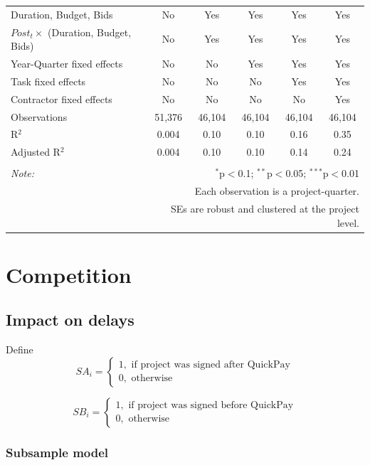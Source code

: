 \documentclass[
]{article}
\begin{document}
\begin{table}[H]
\begin{tabular}{@{\extracolsep{-2pt}}lccccc}
Duration, Budget, Bids & No & Yes & Yes & Yes & Yes \\ 
$Post_t \times $  (Duration, Budget, Bids) & No & Yes & Yes & Yes & Yes \\ 
Year-Quarter fixed effects & No & No & Yes & Yes & Yes \\ 
Task fixed effects & No & No & No & Yes & Yes \\ 
Contractor fixed effects & No & No & No & No & Yes \\ 
Observations & 51,376 & 46,104 & 46,104 & 46,104 & 46,104 \\ 
R$^{2}$ & 0.004 & 0.10 & 0.10 & 0.16 & 0.35 \\ 
Adjusted R$^{2}$ & 0.004 & 0.10 & 0.10 & 0.14 & 0.24 \\ 
\hline 
\hline \\[-1.8ex] 
\textit{Note:}  & \multicolumn{5}{r}{$^{*}$p$<$0.1; $^{**}$p$<$0.05; $^{***}$p$<$0.01} \\ 
 & \multicolumn{5}{r}{Each observation is a project-quarter.} \\ 
 & \multicolumn{5}{r}{SEs are robust and clustered at the project level.} \\ 
\end{tabular} 
\end{table}

\hypertarget{competition}{%
\section{Competition}\label{competition}}

\hypertarget{impact-on-delays}{%
\subsection{Impact on delays}\label{impact-on-delays}}

Define
\[ SA_i = \begin{cases} 1, \text{ if project was signed after QuickPay}\\
0, \text{ otherwise} \end{cases}\]

\[ SB_i = \begin{cases} 1, \text{ if project was signed before QuickPay}\\
0, \text{ otherwise} \end{cases}\]

\hypertarget{subsample-model}{%
\subsubsection{Subsample model}\label{subsample-model}}
\end{document}
